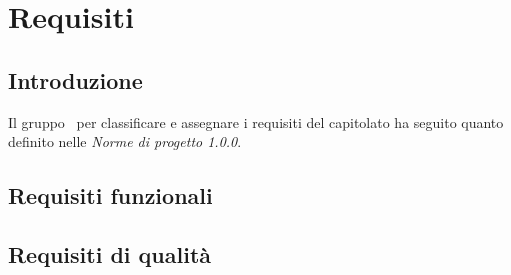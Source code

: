\section{Requisiti}

\subsection{Introduzione}
Il gruppo \groupName\ per classificare e assegnare i requisiti del capitolato ha seguito quanto definito nelle \textit{Norme di progetto 1.0.0}.

\subsection{Requisiti funzionali}

\subsection{Requisiti di qualità}
